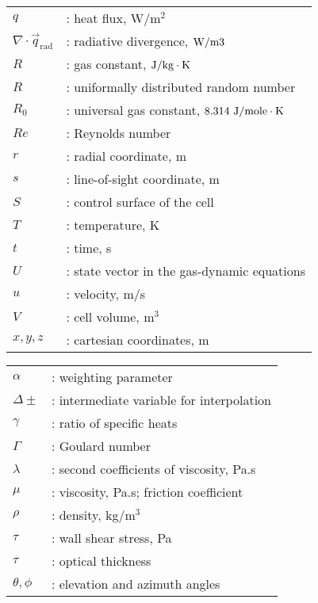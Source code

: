 \documentclass[12pt,a4paper,twoside]{article}
\begin{document}
\begin{tabular}{ll}
$q$     & : heat flux, W/m$^2$ \\
$\nabla \cdot \vec{q}_\text{rad}$  & : radiative divergence, $\rm W/m3$ \\
$R$	& : gas constant, $\rm J/kg \cdot K$ \\
$R$  & : uniformally distributed random number \\
$R_0$	& : universal gas constant, $\rm 8.314~J/mole \cdot K$ \\
$Re$	& : Reynolds number \\
$r$            & : radial coordinate, m \\
$s$           & : line-of-sight coordinate, m \\
$S$            & : control surface of the cell \\
$T$	& : temperature, K \\
$t$	& : time, s \\
$U$	& : state vector in the gas-dynamic equations \\
$u$            & : velocity, m/s \\
$V$            & : cell volume, m$^3$ \\
$x, y, z$      & : cartesian coordinates, m \\
\end{tabular}

\begin{tabular}{ll}
$\alpha$	& : weighting parameter \\
$\Delta\pm$     & : intermediate variable for interpolation \\
$\gamma$       & : ratio of specific heats \\
$\Gamma$      & : Goulard number \\        
$\lambda$ & : second coefficients of viscosity, Pa.s \\
$\mu$		& : viscosity, Pa.s; friction coefficient \\
$\rho$         & : density, kg/m$^3$ \\
$\tau$		& : wall shear stress, Pa \\
$\tau$                 & : optical thickness \\
$\theta, \phi$     & : elevation and azimuth angles \\              
\end{tabular}
\end{document}
